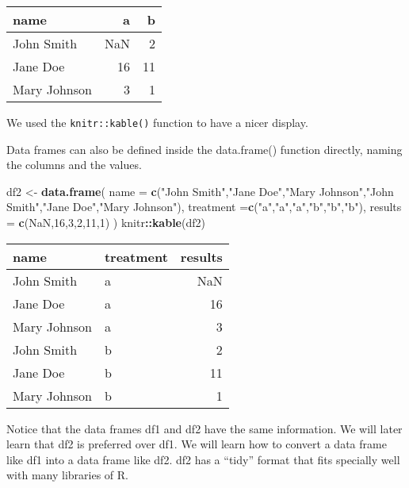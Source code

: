 \documentclass[
]{book}
\newenvironment{Shaded}{\begin{snugshade}}{\end{snugshade}}
\newcommand{\AttributeTok}[1]{\textcolor[rgb]{0.13,0.29,0.53}{#1}}
\newcommand{\ConstantTok}[1]{\textcolor[rgb]{0.56,0.35,0.01}{#1}}
\newcommand{\DecValTok}[1]{\textcolor[rgb]{0.00,0.00,0.81}{#1}}
\newcommand{\FunctionTok}[1]{\textcolor[rgb]{0.13,0.29,0.53}{\textbf{#1}}}
\newcommand{\NormalTok}[1]{#1}
\newcommand{\OtherTok}[1]{\textcolor[rgb]{0.56,0.35,0.01}{#1}}
\newcommand{\SpecialCharTok}[1]{\textcolor[rgb]{0.81,0.36,0.00}{\textbf{#1}}}
\newcommand{\StringTok}[1]{\textcolor[rgb]{0.31,0.60,0.02}{#1}}
\theoremstyle{definition}
\theoremstyle{definition}
\theoremstyle{definition}
\theoremstyle{definition}
\theoremstyle{remark}
\begin{document}
\begin{tabular}{l|r|r}
\hline
name & a & b\\
\hline
John Smith & NaN & 2\\
\hline
Jane Doe & 16 & 11\\
\hline
Mary Johnson & 3 & 1\\
\hline
\end{tabular}

We used the \texttt{knitr::kable()} function to have a nicer display.

Data frames can also be defined inside the data.frame() function directly, naming the columns and the values.

\begin{Shaded}
\begin{Highlighting}[]
\NormalTok{df2 }\OtherTok{\textless{}{-}} \FunctionTok{data.frame}\NormalTok{(}
  \AttributeTok{name =} \FunctionTok{c}\NormalTok{(}\StringTok{"John Smith"}\NormalTok{,}\StringTok{"Jane Doe"}\NormalTok{,}\StringTok{"Mary Johnson"}\NormalTok{,}\StringTok{"John Smith"}\NormalTok{,}\StringTok{"Jane Doe"}\NormalTok{,}\StringTok{"Mary Johnson"}\NormalTok{),}
  \AttributeTok{treatment =}\FunctionTok{c}\NormalTok{(}\StringTok{"a"}\NormalTok{,}\StringTok{"a"}\NormalTok{,}\StringTok{"a"}\NormalTok{,}\StringTok{"b"}\NormalTok{,}\StringTok{"b"}\NormalTok{,}\StringTok{"b"}\NormalTok{),}
  \AttributeTok{results =} \FunctionTok{c}\NormalTok{(}\ConstantTok{NaN}\NormalTok{,}\DecValTok{16}\NormalTok{,}\DecValTok{3}\NormalTok{,}\DecValTok{2}\NormalTok{,}\DecValTok{11}\NormalTok{,}\DecValTok{1}\NormalTok{)}
\NormalTok{)}
\NormalTok{knitr}\SpecialCharTok{::}\FunctionTok{kable}\NormalTok{(df2)}
\end{Highlighting}
\end{Shaded}

\begin{tabular}{l|l|r}
\hline
name & treatment & results\\
\hline
John Smith & a & NaN\\
\hline
Jane Doe & a & 16\\
\hline
Mary Johnson & a & 3\\
\hline
John Smith & b & 2\\
\hline
Jane Doe & b & 11\\
\hline
Mary Johnson & b & 1\\
\hline
\end{tabular}

Notice that the data frames df1 and df2 have the same information. We will later learn that df2 is preferred over df1. We will learn how to convert a data frame like df1 into a data frame like df2. df2 has a ``tidy'' format that fits specially well with many libraries of R.
\end{document}
